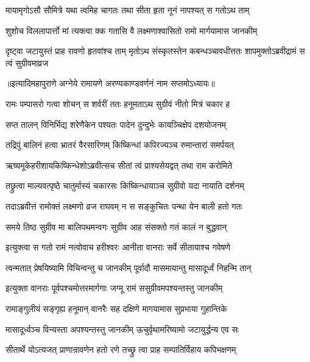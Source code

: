 \twolineshloka
{मायामृगोऽसौ सौमित्रे यथा त्वमिह चागतः }
{तथा सीता हृता नूनं नापश्यत् स गतोऽथ ताम्}%

\twolineshloka
{शुशोच विललापार्त्तो मां त्यक्त्वा क्क गतासि वै}
{लक्ष्मणाश्वासितो रामो मार्गयामास जानकीम्}%

\threelineshloka
{दृष्ट्वा जटायुस्तं प्राह रावणो हृतवांश्च ताम्}
{मृतोऽथ संस्कृतस्तेन कबन्धञ्चावधीत्ततः}
{शापमुक्तोऽब्रवीद्रामं स त्वं सुग्रीवमाव्रज} %

॥इत्यादिमहापुराणे अग्नेये रामायणे अरण्यकाण्डवर्णनं नाम सप्तमोऽध्यायः॥





\twolineshloka
{रामः पम्पासरो गत्वा शोचन् स शर्वरीं ततः}
{हनूमताऽथ सुग्रीवं नीतो मित्रं चकार ह}%

\twolineshloka
{सप्त तालन् विनिर्भिद्य शरेणैकेन पश्यतः}
{पादेन दुन्दुभेः कायञ्चिक्षेप दशयोजनम्}%

\twolineshloka
{तद्रिपुं बालिनं हत्वा भ्रातरं वैरसारिणम्}
{किष्किन्धां कपिरज्यञ्च रुमान्तारां समर्पयत्}%

\twolineshloka
{ऋष्यमूकेहरीशायकिष्किन्धेशोऽब्रवीत्सच }
{सीतां त्वं प्राश्यसेयद्वत् तथा राम करोमिते}%

\twolineshloka
{तछ्रुत्वा माल्यवत्पृष्ठे चातुर्मास्यं चकारसः}
{किष्किन्धायाञ्च सुग्रीवो यदा नायाति दर्शनम्}%

\twolineshloka
{तदाऽब्रवीत्तं रामोक्तं लक्ष्मणो व्रज राघवम्}
{न स सङ्कुचितः पन्था येन बाली हतो गतः}%

\twolineshloka
{समये तिष्ठ सुग्रीव मा बालिपथमन्वगः}
{सुग्रीव आह संसक्तो गतं कालं न बुद्धवान्}%

\twolineshloka
{इत्युक्त्वा स गतो रामं नत्वोवाच हरीश्वरः}
{आनीता वानराः सर्वे सीतायाश्च गवेषणे}%

\twolineshloka
{त्वन्मतात् प्रेषयिष्यामि विचिन्वन्तु च जानकीम् }
{पूर्वादौ मासमायान्तु मासादूर्ध्वं निहन्मि तान्}%

\twolineshloka
{इत्युक्ता वानराः पूर्वपश्चमोत्तरमार्गगाः}
{जग्मू रामं ससुग्रीवमपश्यन्तस्तु जानकीम्}%

\twolineshloka
{रामाङ्गुलीयं सङ्गृह्य हनूमान् वानरैः सह}
{दक्षिणे मागयामास सुप्रभाया गुहान्तिके}%

\twolineshloka
{मासादूर्ध्वञ्च विन्यस्ता अपश्यन्तस्तु जानकीम्}
{ऊचुर्वृथामरिष्यामो जटायुर्द्धन्य एव सः}%

\twolineshloka
{सीतार्थे योऽत्यजत् प्राणान्रावणेन हतो रणे}
{तच्छ्रु त्वा प्राह सम्पातिर्विहाय कपिभक्षणम्}%

